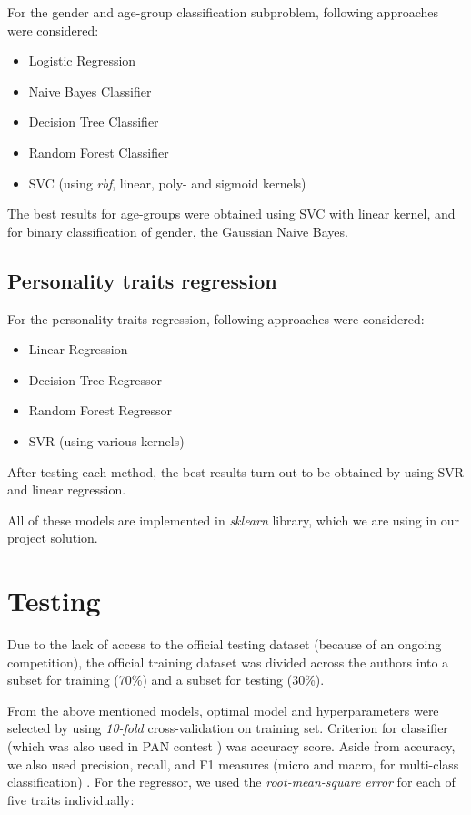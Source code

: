 \documentclass[10pt, a4paper]{article}
\begin{document}
For the gender and age-group classification subproblem, following approaches were considered:
\begin{itemize}
	\item Logistic Regression
	\item Naive Bayes Classifier
	\item Decision Tree Classifier
	\item Random Forest Classifier
	\item SVC (using \textit{rbf}, linear, poly- and sigmoid kernels)
\end{itemize}
\noindent The best results for age-groups were obtained using SVC with linear kernel, and for binary classification of gender, the Gaussian Naive Bayes.

\subsection{Personality traits regression}
For the personality traits regression, following approaches were considered:
\begin{itemize}
	\item Linear Regression
	\item Decision Tree Regressor
	\item Random Forest Regressor
	\item SVR (using various kernels)
\end{itemize}
\noindent After testing each method, the best results turn out to be obtained by using SVR and linear regression.

All of these models are implemented in \textit{sklearn} library, which we are using in our project solution.

\section{Testing}
Due to the lack of access to the official testing dataset (because of an ongoing competition), the official training dataset was divided across the authors into a subset for training (70\%) and a subset for testing (30\%). 

From the above mentioned models, optimal model and hyperparameters were selected by using \textit{10-fold} cross-validation on training set.
Criterion for classifier (which was also used in PAN contest \citep{panoverview}) was accuracy score.
Aside from accuracy, we also used precision, recall, and F1 measures (micro and macro, for multi-class classification) \citep{panoverviewl}.
For the regressor, we used the \textit{root-mean-square error} for each of five traits individually:
\end{document}

